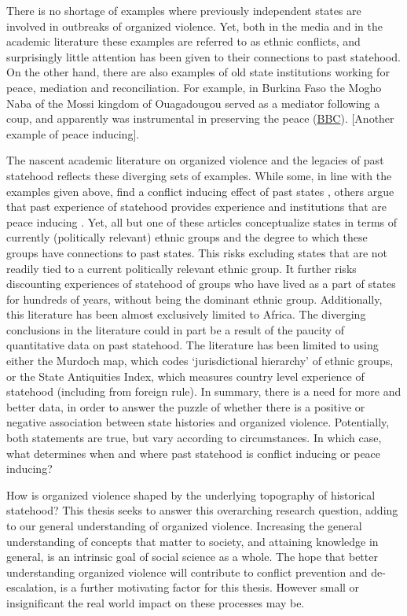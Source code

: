 There is no shortage of examples where previously independent states are
involved in outbreaks of organized violence. Yet, both in the media and in the
academic literature these examples are referred to as ethnic conflicts, and
surprisingly little attention has been given to their connections to past
statehood. On the other hand, there are also examples of old state institutions
working for peace, mediation and reconciliation. For example, in Burkina Faso
the Mogho Naba of the Mossi kingdom of Ouagadougou served as a mediator
following a coup, and apparently was instrumental in preserving the peace
(\href{https://www.bbc.com/news/world-africa-34340704}{BBC}). [Another example
of peace inducing]. 

The nascent academic literature on organized violence and the legacies of past
statehood reflects these diverging sets of examples. While some, in line with
the examples given above, find a conflict inducing effect of past states
\citep{Englebert2002, Paine2019}, others argue that past experience of statehood
provides experience and institutions that are peace inducing \citep{Wig2016,
Wig2018, Depetris-Chauvin2016}. Yet, all but one of these articles conceptualize
states in terms of currently (politically relevant) ethnic groups and the degree
to which these groups have connections to past states. This risks excluding
states that are not readily tied to a current politically relevant ethnic group.
It further risks discounting experiences of statehood of groups who have lived
as a part of states for hundreds of years, without being the dominant ethnic
group. Additionally, this literature has been almost exclusively limited to
Africa. The diverging conclusions in the literature could in part be a result of
the paucity of quantitative data on past statehood. The literature has been
limited to using either the Murdoch map, which codes `jurisdictional hierarchy'
of ethnic groups, or the State Antiquities Index, which measures country level
experience of statehood (including from foreign rule). In summary, there is a
need for more and better data, in order to answer the puzzle of whether there is
a positive or negative association between state histories and organized
violence. Potentially, both statements are true, but vary according to
circumstances. In which case, what determines when and where past statehood is
conflict inducing or peace inducing?


How is organized violence shaped by the underlying topography of historical
statehood? This thesis seeks to answer this overarching research question,
adding to our general understanding of organized violence. Increasing the
general understanding of concepts that matter to society, and attaining
knowledge in general, is an intrinsic goal of social science as a whole. The
hope that better understanding organized violence will contribute to conflict
prevention and de-escalation, is a further motivating factor for this thesis.
However small or insignificant the real world impact on these processes may be.

